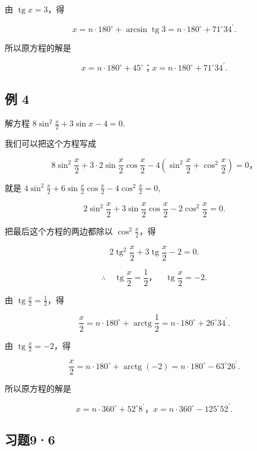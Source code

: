 由 \(\operatorname{tg} x = 3\)，得

\[
x = n \cdot 180 ^{\circ} + \arcsin \operatorname{tg} 3 = n \cdot 180 ^{\circ} + 71 ^{\circ} 34 ^{\prime}.
\]

所以原方程的解是

\[
x = n \cdot 180 ^{\circ} + 45 ^{\circ}\text{；} x = n \cdot 180 ^{\circ} + 71 ^{\circ} 34 ^{\prime}.
\]

\subsection{例 4}

解方程 \(8\sin^2\frac{x}{2} + 3\sin x - 4 = 0.\)

 我们可以把这个方程写成

\[
8 \sin^ {2} \frac {x}{2} + 3 \cdot 2 \sin \frac {x}{2} \cos \frac {x}{2} - 4 \left(\sin^ {2} \frac {x}{2} + \cos^ {2} \frac {x}{2}\right) = 0\text{，}
\]

就是
\(4\sin^2\frac{x}{2} + 6\sin \frac{x}{2}\cos \frac{x}{2} - 4\cos^2\frac{x}{2} = 0,\)

\[
2 \sin^ {2} \frac {x}{2} + 3 \sin \frac {x}{2} \cos \frac {x}{2} - 2 \cos^ {2} \frac {x}{2} = 0.
\]

把最后这个方程的两边都除以 \(\cos^2\frac{x}{2}\)，得

\[
2 \operatorname{tg} ^ {2} \frac {x}{2} + 3 \operatorname{tg} \frac {x}{2} - 2 = 0.
\]

\[
\therefore \quad \operatorname{tg} \frac {x}{2} = \frac {1}{2}\text{，} \quad \operatorname{tg} \frac {x}{2} = - 2.
\]

由 \(\operatorname{tg} \frac{x}{2} = \frac{1}{2}\)，得

\[
\frac {x}{2} = n \cdot 180 ^{\circ} + \operatorname{arctg} \frac {1}{2} = n \cdot 180 ^{\circ} + 26 ^{\circ} 34 ^{\prime}.
\]

由 \(\operatorname{tg} \frac{x}{2} = -2\)，得

\[
\frac {x}{2} = n \cdot 180 ^{\circ} + \operatorname{arctg} (- 2) = n \cdot 180 ^{\circ} - 63 ^{\circ} 26 ^{\prime}.
\]

所以原方程的解是

\[
x = n \cdot 360 ^{\circ} + 52 ^{\circ} 8 ^{\prime}\text{，} x = n \cdot 360 ^{\circ} - 125 ^{\circ} 52 ^{\prime}.
\]

\subsection{习题9·6}

